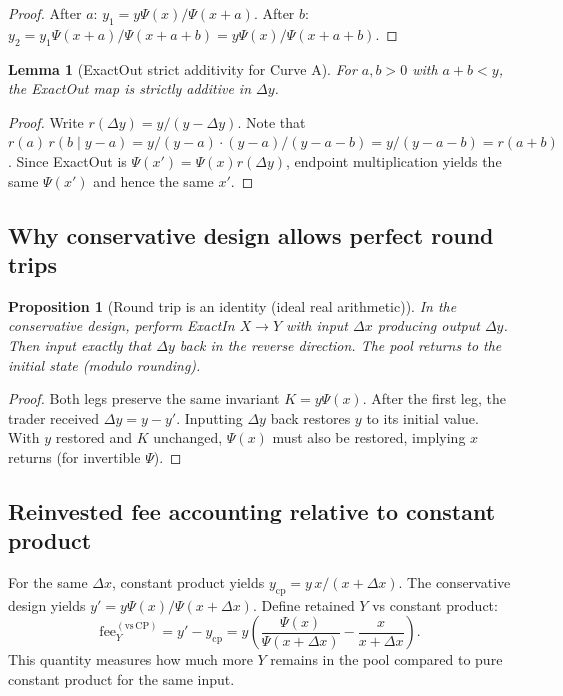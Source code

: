\documentclass[11pt]{article}
\newtheorem{lemma}[theorem]{Lemma}
\newtheorem{proposition}[theorem]{Proposition}
\theoremstyle{definition}
\theoremstyle{remark}
\newcommand{\dx}{\Delta x}
\newcommand{\dy}{\Delta y}
\begin{document}
\begin{proof}
After $a$: $y_1=y\Psi(x)/\Psi(x+a)$. After $b$: $y_2=y_1\Psi(x+a)/\Psi(x+a+b)=y\Psi(x)/\Psi(x+a+b)$.
\end{proof}

\begin{lemma}[ExactOut strict additivity for Curve A]
For $a,b>0$ with $a+b<y$, the ExactOut map is strictly additive in $\dy$.
\end{lemma}

\begin{proof}
Write $r(\dy)=y/(y-\dy)$. Note that $r(a)\,r(b\mid y-a)=y/(y-a)\cdot (y-a)/(y-a-b)=y/(y-a-b)=r(a+b)$.
Since ExactOut is $\Psi(x')=\Psi(x)r(\dy)$, endpoint multiplication yields the same $\Psi(x')$ and hence the same $x'$.
\end{proof}

\subsection{Why conservative design allows perfect round trips}

\begin{proposition}[Round trip is an identity (ideal real arithmetic)]
In the conservative design, perform ExactIn $X\to Y$ with input $\dx$ producing output $\dy$. Then input exactly that $\dy$ back in the reverse direction. The pool returns to the initial state (modulo rounding).
\end{proposition}

\begin{proof}
Both legs preserve the same invariant $K=y\Psi(x)$. After the first leg, the trader received $\dy=y-y'$. Inputting $\dy$ back restores $y$ to its initial value. With $y$ restored and $K$ unchanged, $\Psi(x)$ must also be restored, implying $x$ returns (for invertible $\Psi$).
\end{proof}

\subsection{Reinvested fee accounting relative to constant product}

For the same $\dx$, constant product yields $y_{\mathrm{cp}}=y\,x/(x+\dx)$. The conservative design yields $y'=y\Psi(x)/\Psi(x+\dx)$.
Define retained $Y$ vs constant product:
\[
\boxed{\mathrm{fee}_Y^{(\mathrm{vs\,CP})}=y' - y_{\mathrm{cp}} = y\left(\frac{\Psi(x)}{\Psi(x+\dx)}-\frac{x}{x+\dx}\right).}
\]
This quantity measures how much more $Y$ remains in the pool compared to pure constant product for the same input.
\end{document}
